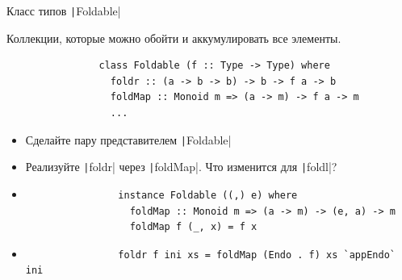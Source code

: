     \begin{frame}[fragile]{Класс типов \texttt|Foldable|}
        \begin{block}{}
            Коллекции, которые можно обойти и аккумулировать все элементы.
            \begin{verbatim}
                class Foldable (f :: Type -> Type) where
                  foldr :: (a -> b -> b) -> b -> f a -> b
                  foldMap :: Monoid m => (a -> m) -> f a -> m
                  ...
            \end{verbatim}
        \end{block}
        \begin{itemize}
            \item[\todo] Сделайте пару представителем \texttt|Foldable|
            \item[\todo] Реализуйте \texttt|foldr| через \texttt|foldMap|. Что изменится для \texttt|foldl|?
            \item[\answer] \pause
            \begin{verbatim}
                instance Foldable ((,) e) where
                  foldMap :: Monoid m => (a -> m) -> (e, a) -> m
                  foldMap f (_, x) = f x
            \end{verbatim}
            \item[\answer] \pause
            \begin{verbatim}
                foldr f ini xs = foldMap (Endo . f) xs `appEndo` ini
            \end{verbatim}
        \end{itemize}
    \end{frame}

